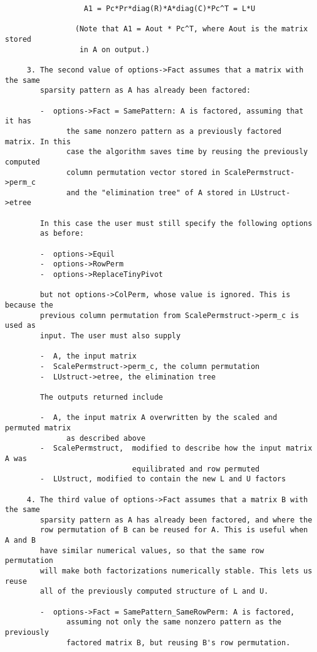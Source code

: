 \begin{verbatim}
                  A1 = Pc*Pr*diag(R)*A*diag(C)*Pc^T = L*U
  
                (Note that A1 = Aout * Pc^T, where Aout is the matrix stored
                 in A on output.)
  
     3. The second value of options->Fact assumes that a matrix with the same
        sparsity pattern as A has already been factored:
       
        -  options->Fact = SamePattern: A is factored, assuming that it has
              the same nonzero pattern as a previously factored matrix. In this
              case the algorithm saves time by reusing the previously computed
              column permutation vector stored in ScalePermstruct->perm_c
              and the "elimination tree" of A stored in LUstruct->etree
  
        In this case the user must still specify the following options
        as before:
  
        -  options->Equil
        -  options->RowPerm
        -  options->ReplaceTinyPivot
  
        but not options->ColPerm, whose value is ignored. This is because the
        previous column permutation from ScalePermstruct->perm_c is used as
        input. The user must also supply 
  
        -  A, the input matrix
        -  ScalePermstruct->perm_c, the column permutation
        -  LUstruct->etree, the elimination tree
  
        The outputs returned include
           
        -  A, the input matrix A overwritten by the scaled and permuted matrix
              as described above
        -  ScalePermstruct,  modified to describe how the input matrix A was
                             equilibrated and row permuted
        -  LUstruct, modified to contain the new L and U factors
  
     4. The third value of options->Fact assumes that a matrix B with the same
        sparsity pattern as A has already been factored, and where the
        row permutation of B can be reused for A. This is useful when A and B
        have similar numerical values, so that the same row permutation
        will make both factorizations numerically stable. This lets us reuse
        all of the previously computed structure of L and U.
  
        -  options->Fact = SamePattern_SameRowPerm: A is factored,
              assuming not only the same nonzero pattern as the previously
              factored matrix B, but reusing B's row permutation.
  

\end{verbatim}
